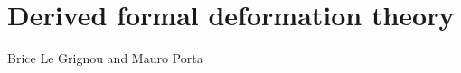 \chapter{Derived formal deformation theory}
\begin{flushright}
  Brice Le Grignou and Mauro Porta
\end{flushright}

\begin{refsection}

\end{refsection}
